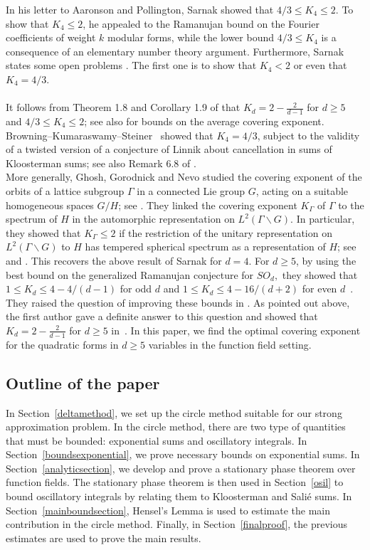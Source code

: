 \documentclass[10pt]{amsart}
\theoremstyle{plain}
\theoremstyle{plain}
\theoremstyle{remark}
\theoremstyle{definition}
\begin{document}
In his letter \cite{Sarnak2} to  Aaronson and  Pollington, Sarnak showed that $4/3\leq K_4 \leq 2$. To show that $K_4\leq 2$, he appealed to the Ramanujan bound on the Fourier coefficients of weight $k$ modular forms, while the lower bound $4/3\leq K_4$ is a consequence of an elementary number theory argument. Furthermore, Sarnak states some open problems \cite[Page $24$]{Sarnak2}.  The first one is to show that  $K_4<2$ or  even that $K_4=4/3$.\\
\\
It follows from Theorem 1.8 and Corollary 1.9 of \cite{Naser2} that $K_d=2-\frac{2}{d-1}$ for $d\geq 5$ and $4/3\leq K_4 \leq 2$; see also \cite{Siegel} for bounds on the average covering exponent.  Browning--Kumaraswamy--Steiner~\cite{BKS} showed that $K_4 = 4/3$, subject to the validity of a twisted version of a conjecture of Linnik about cancellation in sums of Kloosterman sums; see also Remark 6.8 of \cite{Naser2}. 
\\

More generally, Ghosh, Gorodnick and Nevo studied the covering exponent of the orbits of a lattice subgroup $\Gamma$ in a connected Lie group $G$, acting on a suitable homogeneous spaces $G/H$; see \cite{GN,GGN, GGN1,GGN2}. They linked  the covering exponent $K_{\Gamma}$ of $\Gamma$ to the spectrum of $H$ in the automorphic representation on $L^2(\Gamma\backslash G).$ In particular, they showed that $K_{\Gamma} \leq 2$ if  the restriction of the unitary representation on $L^2(\Gamma\backslash G)$ to $H$ has tempered spherical spectrum as a representation of $H$; see~\cite[Theorem 3.5]{GGN2} and \cite[Theorem 3.3]{GGN1}.  This recovers  the above result of Sarnak for $d=4.$  For $d\geq 5$, by using the best bound on  the generalized Ramanujan conjecture for $SO_{d},$ they showed that    $1 \leq K_d\leq 4-4/(d-1) $ for odd $d$ and $1 \leq K_d\leq  4-16/(d+2)$ for even $d$~\cite[Page 12]{GGN}. They raised the question of improving  these bounds in \cite[Page 11]{GGN}. As pointed out above, the first author gave a definite answer to this question and showed that $K_d=2-\frac{2}{d-1}$ for $d\geq 5$ in~\cite{Naser2}. In this paper, we find the optimal covering exponent for the quadratic forms in $d\geq 5$ variables in the function field setting. 

\subsection{Outline of the paper}In Section~\ref{deltamethod}, we set up the circle method suitable for our strong approximation problem. In the circle method, there are two type of quantities that must be bounded: exponential sums and oscillatory integrals. In Section~\ref{boundsexponential}, we prove necessary bounds on exponential sums. In Section~\ref{analyticsection}, we develop and prove a stationary phase theorem over function fields. The stationary phase theorem is then used in Section~\ref{osil} to bound oscillatory integrals by relating them to Kloosterman and Sali\'e sums. In Section~\ref{mainboundsection}, Hensel's Lemma is used to estimate the main contribution in the circle method. Finally, in Section~\ref{finalproof}, the previous estimates are used to prove the main results.
\end{document}
